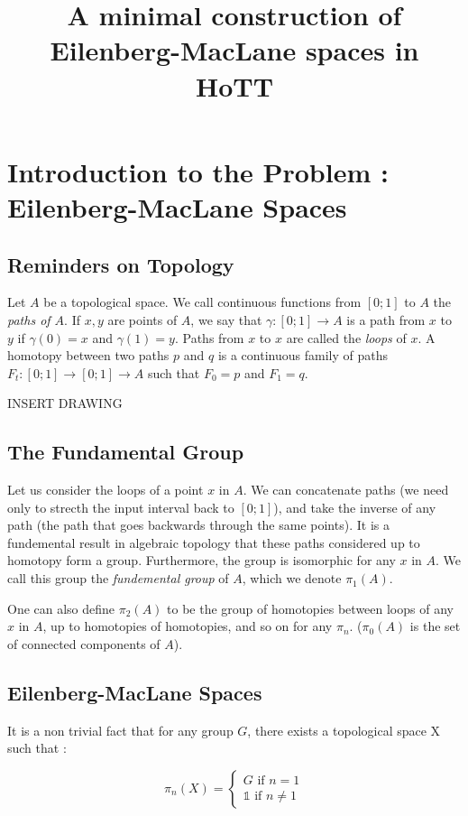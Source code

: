 \documentclass{article}
\title{A minimal construction of Eilenberg-MacLane spaces in HoTT}
\begin{document}
\section{Introduction to the Problem : Eilenberg-MacLane Spaces}

\subsection{Reminders on Topology}

Let $A$ be a topological space. We call continuous functions from $[0;1]$ to $A$ the \emph{paths of $A$}. If $x,y$ are points of $A$, we say that $\gamma : [0;1] \to A$ is a path from $x$ to $y$ if $\gamma(0) = x$ and $\gamma(1) = y$. Paths from $x$ to $x$ are called the \emph{loops} of $x$. A homotopy between two paths $p$ and $q$ is a continuous family of paths $F_{t} : [0;1] \to [0;1] \to A$ such that $F_{0} = p$ and $F_{1} = q$.

INSERT DRAWING

\subsection{The Fundamental Group}

Let us consider the loops of a point $x$ in $A$. We can concatenate paths (we need only to strecth the input interval back to $[0;1]$), and take the inverse of any path (the path that goes backwards through the same points). It is a fundemental result in algebraic topology that these paths considered up to homotopy form a group. Furthermore, the group is isomorphic for any $x$ in $A$. We call this group the \emph{fundemental group} of $A$, which we denote $\pi_{1}(A)$.

One can also define $\pi_{2}(A)$ to be the group of homotopies between loops of any $x$ in $A$, up to homotopies of homotopies, and so on for any $\pi_{n}$. ($\pi_{0}(A)$ is the set of connected components of $A$).

\subsection{Eilenberg-MacLane Spaces}

It is a non trivial fact that for any group $G$, there exists a topological space X such that :

\[
\pi_{n}(X) =
\begin{cases}
  G \text{ if } n = 1 \\
  \mathbb{1} \text{ if } n \neq 1
\end{cases}
\]
\end{document}
